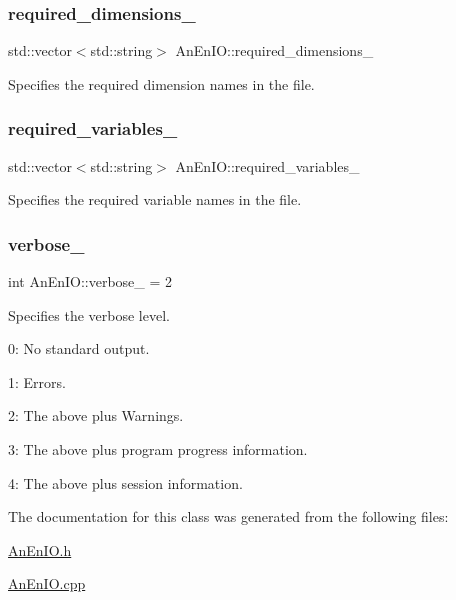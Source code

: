 \subsubsection{\texorpdfstring{required\+\_\+dimensions\+\_\+}{required\_dimensions\_}}
{\footnotesize\ttfamily std\+::vector$<$std\+::string$>$ An\+En\+I\+O\+::required\+\_\+dimensions\+\_\+\hspace{0.3cm}{\ttfamily [protected]}}

Specifies the required dimension names in the file. \mbox{\label{class_an_en_i_o_a119dcb81d3811547f0e37d6c3752f0a7}} 
\subsubsection{\texorpdfstring{required\+\_\+variables\+\_\+}{required\_variables\_}}
{\footnotesize\ttfamily std\+::vector$<$std\+::string$>$ An\+En\+I\+O\+::required\+\_\+variables\+\_\+\hspace{0.3cm}{\ttfamily [protected]}}

Specifies the required variable names in the file. \mbox{\label{class_an_en_i_o_a4f6abd007730e4a8f54d57cc3572bd9e}} 
\subsubsection{\texorpdfstring{verbose\+\_\+}{verbose\_}}
{\footnotesize\ttfamily int An\+En\+I\+O\+::verbose\+\_\+ = 2\hspace{0.3cm}{\ttfamily [protected]}}

Specifies the verbose level.
\begin{DoxyItemize}
\item 0\+: No standard output.
\item 1\+: Errors.
\item 2\+: The above plus Warnings.
\item 3\+: The above plus program progress information.
\item 4\+: The above plus session information. 
\end{DoxyItemize}

The documentation for this class was generated from the following files\+:\begin{DoxyCompactItemize}
\item 
\mbox{\hyperlink{_an_en_i_o_8h}{An\+En\+I\+O.\+h}}\item 
\mbox{\hyperlink{_an_en_i_o_8cpp}{An\+En\+I\+O.\+cpp}}\end{DoxyCompactItemize}
